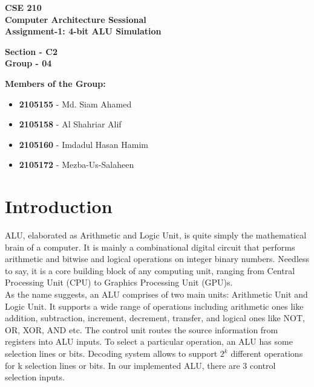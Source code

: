 \documentclass{article}
\begin{document}
\vfill %

\begin{center}
\Huge \textbf{CSE 210}\\
\vspace{0.5cm}
\LARGE \textbf{Computer Architecture Sessional}\\
\vspace{0.5cm}
\LARGE \textbf{Assignment-1: 4-bit ALU Simulation}
\vspace{2cm}

\LARGE \textbf{Section - C2}\\
\LARGE \textbf{Group - 04}

\vspace{2cm}

\LARGE \textbf{Members of the Group:}

\vspace{0.5cm}

\LARGE
\begin{itemize}
    \item \textbf{2105155} - Md. Siam Ahamed
    \item \textbf{2105158} - Al Shahriar Alif
    \item \textbf{2105160} - Imdadul Hasan Hamim
    \item \textbf{2105172} - Mezba-Us-Salaheen
\end{itemize}
\end{center}

\vfill %
\pagebreak


\Large

\section{Introduction}

 ALU, elaborated as Arithmetic and Logic Unit, is quite simply the mathematical brain of a
 computer. It is mainly a combinational digital circuit that performs arithmetic and bitwise
 and logical operations on integer binary numbers. Needless to say, it is a core building block
 of any computing unit, ranging from Central Processing Unit (CPU) to Graphics Processing
 Unit (GPU)s.\\
 
 As the name suggests, an ALU comprises of two main units: Arithmetic Unit and Logic Unit.
 It supports a wide range of operations including arithmetic ones like addition, subtraction,
 increment, decrement, transfer, and logical ones like NOT, OR, XOR, AND etc. The control
 unit routes the source information from registers into ALU inputs. To select a particular
 operation, an ALU has some selection lines or bits. Decoding system allows to support $2^k$
 different operations for k selection lines or bits. In our implemented ALU, there are 3 control
 selection inputs.\\
 
\end{document}
